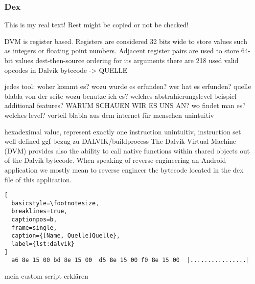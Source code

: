 \subsubsection{Dex} \label{subsubsection:tools-dex}
This is my real text! Rest might be copied or not be checked!

%
DVM is register based. Registers are considered 32 bits wide to store values such as integers or floating point numbers. Adjacent register pairs are used to store 64-bit values\newline
dest-then-source ordering for its arguments\newline
there are 218 used valid opcodes in Dalvik bytecode -> QUELLE \newline
\cite{kovachevaMaster} \cite{ehringerDalvik}
%



jedes tool:\newline
woher kommt es?\newline
wozu wurde es erfunden?\newline
wer hat es erfunden? quelle\newline
blabla von der seite\newline
wozu benutze ich es?\newline
welches abstrahierungslevel\newline
beispiel\newline
additional features?\newline
WARUM SCHAUEN WIR ES UNS AN?\newline
wo findet man es?\newline
welches level?\newline
vorteil\newline
blabla aus dem internet\newline
für menschen unintuitiv

hexadeximal value, represent exactly one instruction\newline
unintuitiv, instruction set well defined\newline
ggf bezug zu DALVIK/buildprocess
The Dalvik Virtual Machine (DVM) provides also the ability to call native functions within shared objects out of the Dalvik bytecode. When speaking of reverse engineering an Android application we mostly mean to reverse engineer the bytecode located in the dex file of this application.\newline

\begin{lstlisting}[
  basicstyle=\footnotesize,
  breaklines=true,
  captionpos=b,
  frame=single,
  caption={[Name, Quelle]Quelle},
  label={lst:dalvik}
]
  a6 8e 15 00 bd 8e 15 00  d5 8e 15 00 f0 8e 15 00  |................|
\end{lstlisting}

mein custom script erklären\newline
